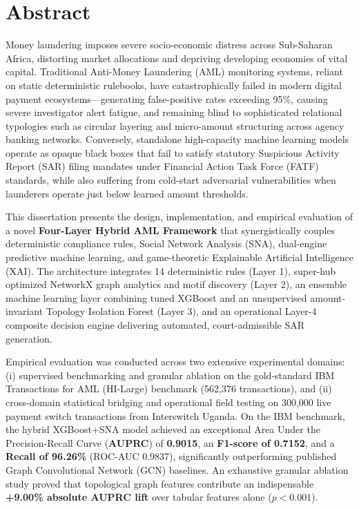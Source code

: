 \documentclass[a4paper,12pt]{report}
\begin{document}
\newpage
\chapter*{Abstract}
Money laundering imposes severe socio-economic distress across Sub-Saharan Africa, distorting market allocations and depriving developing economies of vital capital. Traditional Anti-Money Laundering (AML) monitoring systems, reliant on static deterministic rulebooks, have catastrophically failed in modern digital payment ecosystems---generating false-positive rates exceeding 95\%, causing severe investigator alert fatigue, and remaining blind to sophisticated relational typologies such as circular layering and micro-amount structuring across agency banking networks. Conversely, standalone high-capacity machine learning models operate as opaque black boxes that fail to satisfy statutory Suspicious Activity Report (SAR) filing mandates under Financial Action Task Force (FATF) standards, while also suffering from cold-start adversarial vulnerabilities when launderers operate just below learned amount thresholds.

This dissertation presents the design, implementation, and empirical evaluation of a novel \textbf{Four-Layer Hybrid AML Framework} that synergistically couples deterministic compliance rules, Social Network Analysis (SNA), dual-engine predictive machine learning, and game-theoretic Explainable Artificial Intelligence (XAI). The architecture integrates 14 deterministic rules (Layer 1), super-hub optimized NetworkX graph analytics and motif discovery (Layer 2), an ensemble machine learning layer combining tuned XGBoost and an unsupervised amount-invariant Topology Isolation Forest (Layer 3), and an operational Layer-4 composite decision engine delivering automated, court-admissible SAR generation.

Empirical evaluation was conducted across two extensive experimental domains: (i) supervised benchmarking and granular ablation on the gold-standard IBM Transactions for AML (HI-Large) benchmark (562,376 transactions), and (ii) cross-domain statistical bridging and operational field testing on 300,000 live payment switch transactions from Interswitch Uganda. On the IBM benchmark, the hybrid XGBoost+SNA model achieved an exceptional Area Under the Precision-Recall Curve (\textbf{AUPRC}) of \textbf{0.9015}, an \textbf{F1-score of 0.7152}, and a \textbf{Recall of 96.26\%} (ROC-AUC 0.9837), significantly outperforming published Graph Convolutional Network (GCN) baselines. An exhaustive granular ablation study proved that topological graph features contribute an indispensable \textbf{+9.00\% absolute AUPRC lift} over tabular features alone ($p < 0.001$). 
\end{document}
